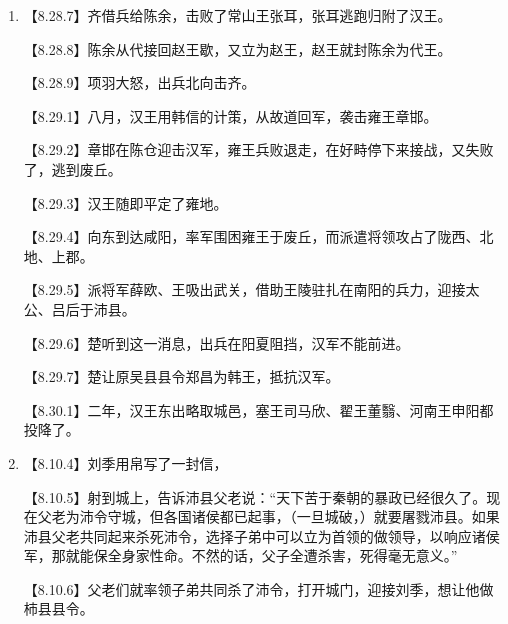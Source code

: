 \documentclass[fontset=none,11pt,a4paper]{ctexart}
\begin{document}
\begin{enumerate}[label=\Alph*.]
\noindent 【8.21.3】等到赵高已经杀了秦二世，派人来见沛公，想要定约瓜分关中称王，沛公以为是诈骗，就采用张良的计策，派郦生、陆贾去游说秦军将领，用私利相诱，趁机袭击武关，攻破了关口。\par
\noindent 【8.21.4】又和秦军在蓝田南面交战，增设疑兵，多树旗帜，所经过的地方不许掳掠。\par
\noindent 【8.21.5】秦地的群众很高兴，秦军懈怠了，因此大破秦军。\par
\noindent 【8.21.6】又在蓝田北面接战，再次打败秦军。\par
\noindent 【8.21.7】乘胜追击，彻底打垮了秦军。\par
\noindent 【8.22.1】汉元年十月，沛公的军队先于各路诸侯到达霸上。\par
  \item
\noindent 【8.28.7】齐借兵给陈余，击败了常山王张耳，张耳逃跑归附了汉王。\par
\noindent 【8.28.8】陈余从代接回赵王歇，又立为赵王，赵王就封陈余为代王。\par
\noindent 【8.28.9】项羽大怒，出兵北向击齐。\par
\noindent 【8.29.1】八月，汉王用韩信的计策，从故道回军，袭击雍王章邯。\par
\noindent 【8.29.2】章邯在陈仓迎击汉军，雍王兵败退走，在好畤停下来接战，又失败了，逃到废丘。\par
\noindent 【8.29.3】汉王随即平定了雍地。\par
\noindent 【8.29.4】向东到达咸阳，率军围困雍王于废丘，而派遣将领攻占了陇西、北地、上郡。\par
\noindent 【8.29.5】派将军薛欧、王吸出武关，借助王陵驻扎在南阳的兵力，迎接太公、吕后于沛县。\par
\noindent 【8.29.6】楚听到这一消息，出兵在阳夏阻挡，汉军不能前进。\par
\noindent 【8.29.7】楚让原吴县县令郑昌为韩王，抵抗汉军。\par
\noindent 【8.30.1】二年，汉王东出略取城邑，塞王司马欣、翟王董翳、河南王申阳都投降了。\par
  \item
\noindent 【8.10.4】刘季用帛写了一封信，\par
\noindent 【8.10.5】射到城上，告诉沛县父老说：“天下苦于秦朝的暴政已经很久了。现在父老为沛令守城，但各国诸侯都已起事，（一旦城破，）就要屠戮沛县。如果沛县父老共同起来杀死沛令，选择子弟中可以立为首领的做领导，以响应诸侯军，那就能保全身家性命。不然的话，父子全遭杀害，死得毫无意义。”\par
\noindent 【8.10.6】父老们就率领子弟共同杀了沛令，打开城门，迎接刘季，想让他做柿县县令。\par

\end{enumerate}
\end{document}
